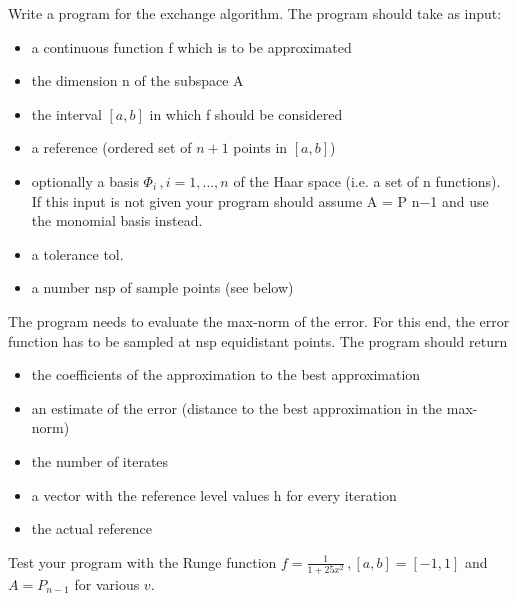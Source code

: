 \begin{problem}
  Write a program for the exchange algorithm. The program should take
  as input:
  \begin{itemize}
  \item a continuous function f which is to be approximated
  \item the dimension n of the subspace A
  \item the interval $[a, b]$ in which f should be considered
  \item a reference (ordered set of $n + 1$ points in $[a, b]$)
  \item optionally a basis $\Phi_i \, , i = 1, \dots , n$ of the Haar
    space (i.e. a set of n functions).    
    If this input is not given your program should assume A = P n−1 and use the
    monomial basis instead.
  \item a tolerance tol.
  \item a number nsp of sample points (see below)
  \end{itemize}
  The program needs to evaluate the max-norm of the error. For this end, the error
  function has to be sampled at nsp equidistant points.
  The program should return
  \begin{itemize}
  \item the coefficients of the approximation to the best approximation
  \item an estimate of the error (distance to the best approximation in the max-norm)
  \item  the number of iterates
  \item  a vector with the reference level values h for every iteration
  \item  the actual reference
  \end{itemize}

  Test your program with the Runge function
  $f = \frac{1}{1 + 25x^2 } \, , [a, b] = [−1, 1]$ and $A = P_{n−1}$
    for various $v$.
  \end{problem}


  \begin{solution}

  \end{solution}

